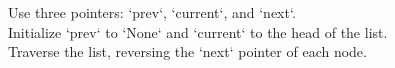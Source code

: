 \documentclass[preview]{standalone}
\begin{document}
Use three pointers: `prev`, `current`, and `next`.\\Initialize `prev` to `None` and `current` to the head of the list.\\Traverse the list, reversing the `next` pointer of each node.\\
\end{document}
